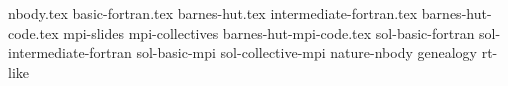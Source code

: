 nbody.tex
basic-fortran.tex
barnes-hut.tex
intermediate-fortran.tex
barnes-hut-code.tex
mpi-slides
mpi-collectives
barnes-hut-mpi-code.tex
sol-basic-fortran
sol-intermediate-fortran
sol-basic-mpi
sol-collective-mpi
nature-nbody
genealogy
rt-like

